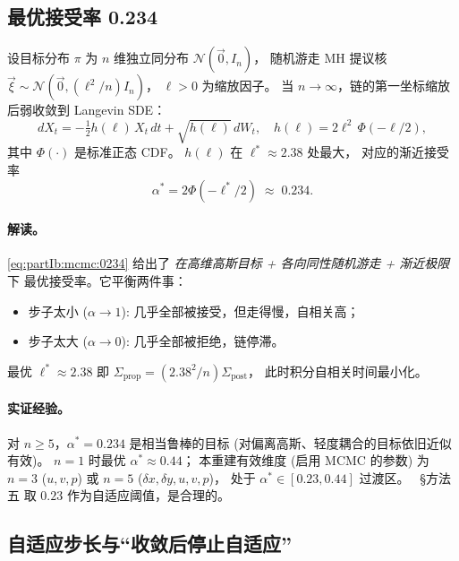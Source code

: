 \subsection{最优接受率 0.234}
\label{sec:partIb:mcmc:opt_accept}

\begin{theorem}
\label{thm:partIb:rgg}
设目标分布 $\pi$ 为 $n$ 维独立同分布 $\mathcal N(\vec 0, I_n)$，
随机游走 MH 提议核 $\vec\xi\sim\mathcal N(\vec 0,(\ell^2/n)I_n)$，
$\ell>0$ 为缩放因子。
当 $n\to\infty$，链的第一坐标缩放后弱收敛到 Langevin SDE：
\begin{equation}
  d X_t = -\tfrac12 h(\ell)\,X_t\,dt + \sqrt{h(\ell)}\,d W_t,
  \quad
  h(\ell)=2\ell^2\,\Phi(-\ell/2),
  \label{eq:partIb:mcmc:rgg_speed}
\end{equation}
其中 $\Phi(\cdot)$ 是标准正态 CDF。
$h(\ell)$ 在 $\ell^{*}\approx 2.38$ 处最大，
对应的渐近接受率
\begin{equation}
  \alpha^{*}=2\Phi(-\ell^{*}/2)\;\approx\;0.234.
  \label{eq:partIb:mcmc:0234}
\end{equation}
\end{theorem}

\paragraph{解读。}
\eqref{eq:partIb:mcmc:0234} 给出了\emph{ 在高维高斯目标 + 各向同性随机游走 + 渐近极限}下
最优接受率。它平衡两件事：
\begin{itemize}[leftmargin=2em]
  \item 步子太小 ($\alpha\to 1$): 几乎全部被接受，但走得慢，自相关高；
  \item 步子太大 ($\alpha\to 0$): 几乎全部被拒绝，链停滞。
\end{itemize}
最优 $\ell^{*}\approx 2.38$ 即 $\Sigma_{\mathrm{prop}}=(2.38^2/n)\Sigma_{\mathrm{post}}$，
此时积分自相关时间最小化。

\paragraph{实证经验。}
对 $n\geq 5$，$\alpha^{*}=0.234$ 是相当鲁棒的目标
(对偏离高斯、轻度耦合的目标依旧近似有效)。
$n=1$ 时最优 $\alpha^{*}\approx 0.44$；
本重建有效维度 (启用 MCMC 的参数) 为 $n=3$ ($u,v,p$)
或 $n=5$ ($\delta x,\delta y,u,v,p$)，
处于 $\alpha^{*}\in[0.23,0.44]$ 过渡区。
\StatusReport\ §方法五 取 $0.23$ 作为自适应阈值，是合理的。

\subsection{自适应步长与“收敛后停止自适应”}
\label{sec:partIb:mcmc:adapt}

